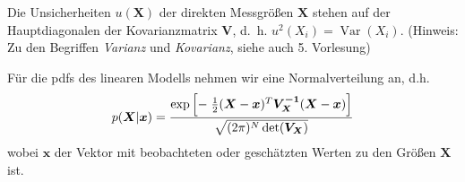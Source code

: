 Die Unsicherheiten $u(\boldsymbol{X})$ der direkten Messgrößen $\boldsymbol{X}$
stehen auf der Hauptdiagonalen der Kovarianzmatrix $\boldsymbol{V}$, d.~h. 
$u^2(X_i) = \operatorname{Var}(X_i)$. (Hinweis: Zu den Begriffen \textsl{Varianz} und 
\textsl{Kovarianz}, siehe auch 5. Vorlesung)

Für die pdfs des linearen Modells nehmen wir eine Normalverteilung 
an, d.h. 
\begin{equation}
p(\boldsymbol{X} | \boldsymbol{x}) = \frac{\textstyle \exp \left[- \; \frac{1}{2} (\boldsymbol{X} - \boldsymbol{x})^T \boldsymbol{V_X^{-1}} (\boldsymbol{X}-\boldsymbol{x}) \right]}{\textstyle \sqrt{(2 \pi)^N \operatorname{det}(\boldsymbol{V_X})}}
\label{eq:pdf_linearModell}
\end{equation}
wobei $\boldsymbol{x}$ der Vektor mit beobachteten oder geschätzten
Werten zu den Größen $\boldsymbol{X}$ ist.


